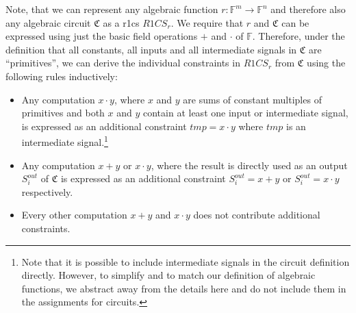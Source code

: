 Note, that we can represent any algebraic function $r:\mathbb{F}^m\to \mathbb{F}^n$ and therefore also any algebraic circuit $\mathfrak{C}$ as a \gls{r1cs} $R1CS_r$.
We require that $r$ and $\mathfrak{C}$ can be expressed using just the basic field operations $+$ and $\cdot $ of $\mathbb{F}$.
Therefore, under the definition that all constants, all inputs and all intermediate signals in $\mathfrak{C}$ are ``primitives'', we can derive the individual constraints in  $R1CS_r$ from $\mathfrak{C}$ using the following rules inductively:
\begin{itemize}
    \item Any computation $x\cdot y$, where $x$ and $y$ are sums of constant multiples of primitives and both $x$ and $y$ contain at least one input or intermediate signal, is expressed as an additional constraint $tmp=x\cdot y$ where $tmp$ is an intermediate signal.\footnote{
        \label{footnote:intermediateSignalsInCircuit}
        Note that it is possible to include intermediate signals in the circuit definition directly.
        However, to simplify and to match our definition of algebraic functions, we abstract away from the details here and do not include them in the assignments for circuits.
    }
    \item Any computation $x+y$ or $x\cdot y$, where the result is directly used as an output $S_{i}^{out}$ of $\mathfrak{C}$ is expressed as an additional constraint $S_{i}^{out}=x + y$ or $S_{i}^{out}=x\cdot y$ respectively.
    \item Every other computation $x+y$ and $x\cdot y$ does not contribute additional constraints.
\end{itemize}

